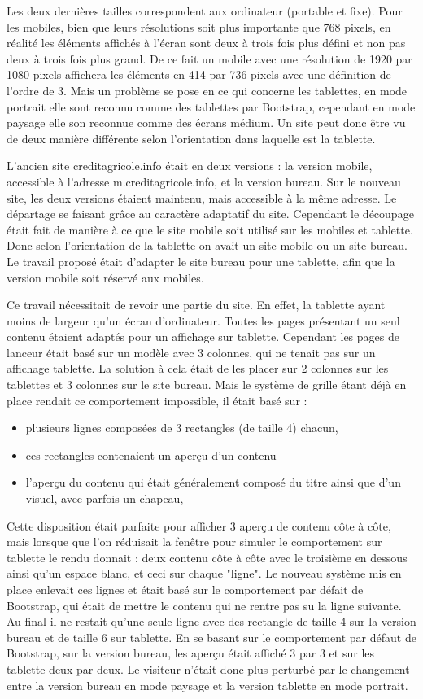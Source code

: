 \documentclass[12pt,a4paper]{article}
\begin{document}
Les deux dernières tailles correspondent aux ordinateur (portable et fixe). Pour les mobiles, bien que leurs résolutions soit plus importante que 768 pixels, en réalité les éléments affichés à l'écran sont deux à trois fois plus défini et non pas deux à trois fois plus grand. De ce fait un mobile avec une résolution de 1920 par 1080 pixels affichera les éléments en 414 par 736 pixels avec une définition de l'ordre de 3. Mais un problème se pose en ce qui concerne les tablettes, en mode portrait elle sont reconnu comme des tablettes par Bootstrap, cependant en mode paysage elle son reconnue comme des écrans médium. Un site peut donc être vu de deux manière différente selon l'orientation dans laquelle est la tablette.\par
\bigskip
L'ancien site creditagricole.info était en deux versions : la version mobile, accessible à l'adresse m.creditagricole.info, et la version bureau. Sur le nouveau site, les deux versions étaient maintenu, mais accessible à la même adresse. Le départage se faisant grâce au caractère adaptatif du site. Cependant le découpage était fait de manière à ce que le site mobile soit utilisé sur les mobiles et tablette. Donc selon l'orientation de la tablette on avait un site mobile ou un site bureau. Le travail proposé était d'adapter le site bureau pour une tablette, afin que la version mobile soit réservé aux mobiles.\par
Ce travail nécessitait de revoir une partie du site. En effet, la tablette ayant moins de largeur qu'un écran d'ordinateur. Toutes les pages présentant un seul contenu étaient adaptés pour un affichage sur tablette. Cependant les pages de lanceur était basé sur un modèle avec 3 colonnes, qui ne tenait pas sur un affichage tablette. La solution à cela était de les placer sur 2 colonnes sur les tablettes et 3 colonnes sur le site bureau. Mais le système de grille étant déjà en place rendait ce comportement impossible, il était basé sur :
\begin{itemize}
\item plusieurs lignes composées de 3 rectangles (de taille 4) chacun,
\item ces rectangles contenaient un aperçu d'un contenu
\item l'aperçu du contenu qui était généralement composé du titre ainsi que d'un visuel, avec parfois un chapeau,
\end{itemize}
Cette disposition était parfaite pour afficher 3 aperçu de contenu côte à côte, mais lorsque que l'on réduisait la fenêtre pour simuler le comportement sur tablette le rendu donnait : deux contenu côte à côte avec le troisième en dessous ainsi qu'un espace blanc, et ceci sur chaque "ligne". Le nouveau système mis en place enlevait ces lignes et était basé sur le comportement par défait de Bootstrap, qui était de mettre le contenu qui ne rentre pas su la ligne suivante. Au final il ne restait qu'une seule ligne avec des rectangle de taille 4 sur la version bureau et de taille 6 sur tablette. En se basant sur le comportement par défaut de Bootstrap, sur la version bureau, les aperçu était affiché 3 par 3 et sur les tablette deux par deux. Le visiteur n'était donc plus perturbé par le changement entre la version bureau en mode paysage et la version tablette en mode portrait.\par
\end{document}
